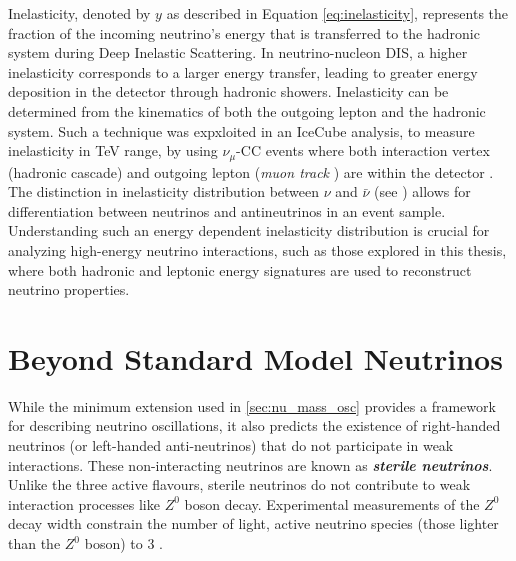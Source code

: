 Inelasticity, denoted by $y$ as described in Equation \ref{eq:inelasticity}, represents the fraction of the incoming neutrino's energy that is transferred to the hadronic system during Deep Inelastic Scattering. In neutrino-nucleon DIS, a higher inelasticity corresponds to a larger energy transfer, leading to greater energy deposition in the detector through hadronic showers. Inelasticity can be determined from the kinematics of both the outgoing lepton and the hadronic system. Such a technique was expxloited in an IceCube analysis, to measure inelasticity in TeV range, by using $\nu_{\mu}$-CC events where both interaction vertex (hadronic cascade) and outgoing lepton (\emph{muon track} ) are within the detector . The distinction in inelasticity distribution between $\nu$ and $\bar{\nu}$ (see ) allows for differentiation between neutrinos and antineutrinos in an event sample. Understanding such an energy dependent inelasticity distribution is crucial for analyzing high-energy neutrino interactions, such as those explored in this thesis, where both hadronic and leptonic energy signatures are used to reconstruct neutrino properties.  


\section{Beyond Standard Model Neutrinos}
\label{sec:bsm}
While the minimum extension used in \ref{sec:nu_mass_osc} provides a framework for describing neutrino oscillations, it also predicts the existence of right-handed neutrinos (or left-handed anti-neutrinos) that do not participate in weak interactions. These non-interacting neutrinos are known as \textbf{\emph{sterile neutrinos}}. Unlike the three active flavours, sterile neutrinos do not contribute to weak interaction processes like $Z^0$ boson decay. Experimental measurements of the $Z^0$ decay width constrain the number of light, active neutrino species (those lighter than the $Z^0$ boson) to 3 . 

